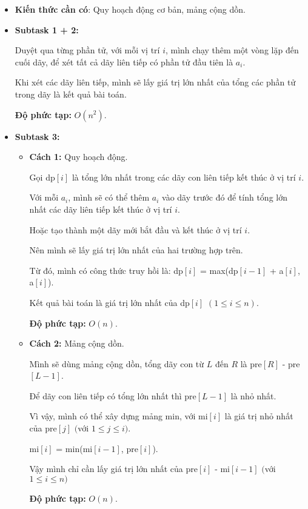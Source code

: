 \documentclass[12pt]{scrartcl}  %
\begin{document}
\begin{itemize}
    \item \textbf{Kiến thức cần có}: Quy hoạch động cơ bản, mảng cộng dồn.
    \item \textbf{Subtask 1 + 2:}
    
    Duyệt qua từng phần tử, với mỗi vị trí $i$, mình chạy
    thêm một vòng lặp đến cuối dãy, để xét tất cả dãy liên tiếp có phần tử đầu tiên là $a_i$.

    Khi xét các dãy liên tiếp, mình sẽ lấy giá trị lớn nhất của tổng các phần tử trong dãy là
    kết quả bài toán.
    
    \textbf{Độ phức tạp:} $O(n^2)$.
    \item \textbf{Subtask 3:}
    \begin{itemize}
        \item \textbf{Cách 1:} Quy hoạch động.
        
        Gọi dp$[i]$ là tổng lớn nhất trong các dãy con liên tiếp kết thúc ở vị trí $i$.

        Với mỗi $a_i$, mình sẽ có thể thêm $a_i$ vào dãy trước đó để tính tổng lớn nhất các dãy liên tiếp kết
        thúc ở vị trí $i$.

        Hoặc tạo thành một dãy mới bắt đầu và kết thúc ở vị trí $i$.

        Nên mình sẽ lấy giá trị lớn nhất của hai trường hợp trên.

        Từ đó, mình có công thức truy hồi là: dp$[i]$ = max(dp$[i - 1]$ + a$[i]$, a$[i]$).

        Kết quả bài toán là giá trị lớn nhất của dp$[i]$ $(1 \leq i \leq n)$.

        \textbf{Độ phức tạp:} $O(n)$.

        \item \textbf{Cách 2:} Mảng cộng dồn.
        
        Mình sẽ dùng mảng cộng dồn, tổng dãy con từ $L$ đến $R$ là pre$[R]$ - pre$[L - 1]$.

        Để dãy con liên tiếp có tổng lớn nhất thì pre$[L - 1]$ là nhỏ nhất.

        Vì vậy, mình có thể xây dựng mảng min, với mi$[i]$ là giá trị nhỏ nhất của
        pre$[j]$ $($với $1 \leq j \leq i)$.

        mi$[i]$ = min(mi$[i - 1]$, pre$[i]$).

        Vậy mình chỉ cần lấy giá trị lớn nhất của pre$[i]$ - mi$[i - 1]$ $($với $1 \leq i \leq n)$
        
        \textbf{Độ phức tạp:} $O(n)$.

    \end{itemize}
\end{itemize}
\end{document}
